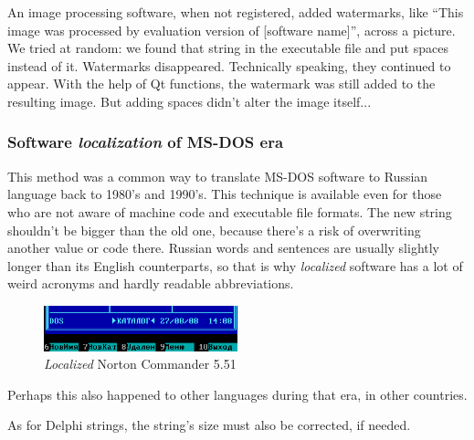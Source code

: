 An image processing software, when not registered, added watermarks,
like ``This image was processed by evaluation version of [software name]'', across a picture.
We tried at random: we found that string in the executable file and put spaces instead of it.
Watermarks disappeared.
Technically speaking, they continued to appear.
With the help of Qt functions, the watermark was still added to the resulting image.
But adding spaces didn't alter the image itself...

\subsubsection{Software \emph{localization} of MS-DOS era}

This method was a common way to translate MS-DOS software to Russian language back to 1980's and 1990's.
This technique is available even for those who are not aware of machine code and executable file formats.
The new string shouldn't be bigger than the old one, because there's a risk of overwriting another value or code
there.
Russian words and sentences are usually slightly longer than its English counterparts, so that is why \emph{localized}
software has a lot of weird acronyms and hardly readable abbreviations.

\begin{figure}[H]
\centering
\includegraphics[width=0.5\textwidth]{patterns/01_helloworld/Norton_Commander_v5_51.png}
\caption{\emph{Localized} Norton Commander 5.51}
\end{figure}

Perhaps this also happened to other languages during that era, in other countries.

As for Delphi strings, the string's size must also be corrected, if needed.
